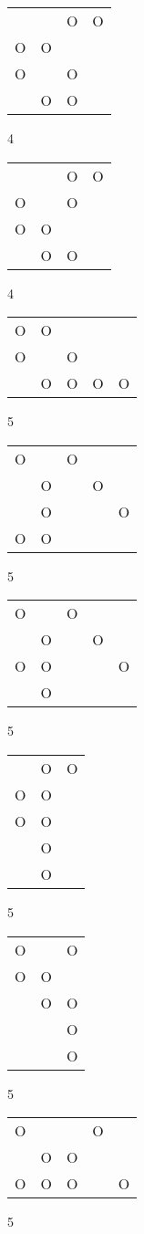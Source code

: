 \begin{tabular}{|m{0.2cm}m{0.2cm}m{0.2cm}m{0.2cm}|}\hline
 & &O&O\\
O&O& & \\
O& &O& \\
 &O&O& \\
\hline\end{tabular}4
\begin{tabular}{|m{0.2cm}m{0.2cm}m{0.2cm}m{0.2cm}|}\hline
 & &O&O\\
O& &O& \\
O&O& & \\
 &O&O& \\
\hline\end{tabular}4
\begin{tabular}{|m{0.2cm}m{0.2cm}m{0.2cm}m{0.2cm}m{0.2cm}|}\hline
O&O& & & \\
O& &O& & \\
 &O&O&O&O\\
\hline\end{tabular}5
\begin{tabular}{|m{0.2cm}m{0.2cm}m{0.2cm}m{0.2cm}m{0.2cm}|}\hline
O& &O& & \\
 &O& &O& \\
 &O& & &O\\
O&O& & & \\
\hline\end{tabular}5
\begin{tabular}{|m{0.2cm}m{0.2cm}m{0.2cm}m{0.2cm}m{0.2cm}|}\hline
O& &O& & \\
 &O& &O& \\
O&O& & &O\\
 &O& & & \\
\hline\end{tabular}5
\begin{tabular}{|m{0.2cm}m{0.2cm}m{0.2cm}|}\hline
 &O&O\\
O&O& \\
O&O& \\
 &O& \\
 &O& \\
\hline\end{tabular}5
\begin{tabular}{|m{0.2cm}m{0.2cm}m{0.2cm}|}\hline
O& &O\\
O&O& \\
 &O&O\\
 & &O\\
 & &O\\
\hline\end{tabular}5
\begin{tabular}{|m{0.2cm}m{0.2cm}m{0.2cm}m{0.2cm}m{0.2cm}|}\hline
O& & &O& \\
 &O&O& & \\
O&O&O& &O\\
\hline\end{tabular}5
